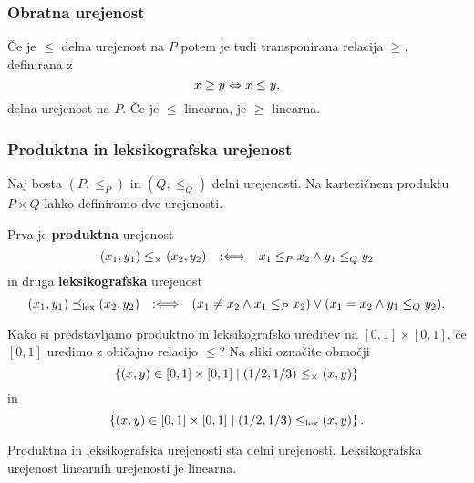 \subsubsection{Obratna urejenost}

Če je $\leq$ delna urejenost na $P$ potem je tudi transponirana relacija $\geq$, definirana z
%
\begin{equation*}
    x \geq y \Leftrightarrow x \leq y,
\end{equation*}
%
delna urejenost na $P$. Če je $\leq$ linearna, je $\geq$ linearna.

\subsubsection{Produktna in leksikografska urejenost}

Naj bosta $(P, {\leq_P})$ in $(Q, {\leq_Q})$ delni urejenosti. Na kartezičnem produktu $P \times Q$ lahko definiramo dve urejenosti.

Prva je \textbf{produktna} urejenost
%
\begin{equation*}
  (x_1,y_1) \leq_{\times} (x_2,y_2) \quad {{:}{\Longleftrightarrow}}\quad x_1 \leq_P x_2 \land y_1 \leq_Q y_2
\end{equation*}
%
in druga \textbf{leksikografska} urejenost
%
\begin{equation*}
  (x_1,y_1) \preceq_\mathrm{lex} (x_2,y_2)
  \quad {{:}{\Longleftrightarrow}}\quad (x_1 \neq x_2 \land x_1 \leq_P x_2) \lor (x_1 = x_2 \land y_1 \leq_Q y_2).
\end{equation*}


\begin{vaja}
  Kako si predstavljamo produktno in leksikografsko ureditev na $[0,1] \times [0,1]$, če $[0,1]$ uredimo z običajno relacijo $\leq$? Na sliki označite območji
  \begin{equation*}
    \left\{(x,y) \in [0,1] \times [0, 1] \; \middle| \; (1/2,1/3) \leq_\times (x,y)\right\}
  \end{equation*}
  in
  \begin{equation*}
    \left\{(x,y) \in [0,1] \times [0, 1] \; \middle| \; (1/2,1/3) \leq_\mathrm{lex} (x,y)\right\}.
  \end{equation*}
\end{vaja}

\begin{izjava}
  Produktna in leksikografska urejenosti sta delni urejenosti. Leksikografska urejenost linearnih urejenosti je linearna.
\end{izjava}

